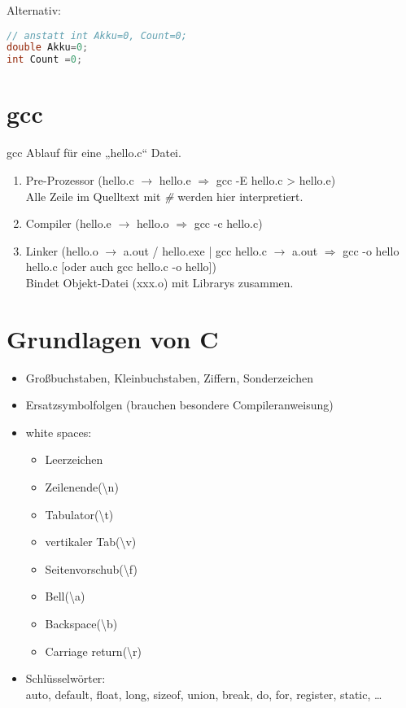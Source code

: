 Alternativ:
\begin{lstlisting}[language=C]
// anstatt int Akku=0, Count=0;
double Akku=0;
int Count =0;
\end{lstlisting}

\section{gcc}

gcc Ablauf für eine „hello.c“ Datei.

\begin{enumerate}
\item Pre-Prozessor (hello.c $\rightarrow$ hello.e $\Rightarrow$ gcc -E hello.c > hello.e) \\
Alle Zeile im Quelltext mit \emph{\#} werden hier interpretiert.
\item Compiler (hello.e $\rightarrow$ hello.o $\Rightarrow$ gcc -c hello.c)
\item Linker (hello.o $\rightarrow$ a.out / hello.exe | gcc hello.c $\rightarrow$ a.out $\Rightarrow$ gcc -o hello hello.c [oder auch gcc hello.c -o hello])\\
Bindet Objekt-Datei (xxx.o) mit Librarys zusammen.
\end{enumerate}

\section{Grundlagen von C}

\begin{itemize}
\item Großbuchstaben, Kleinbuchstaben, Ziffern, Sonderzeichen
\item Ersatzsymbolfolgen (brauchen besondere Compileranweisung)
\item white spaces: 
\begin{itemize}
\item Leerzeichen
\item Zeilenende(\textbackslash n)
\item Tabulator(\textbackslash t)
\item vertikaler Tab(\textbackslash v)
\item Seitenvorschub(\textbackslash f)
\item Bell(\textbackslash a)
\item Backspace(\textbackslash b)
\item Carriage return(\textbackslash r)
\end{itemize}
\item Schlüsselwörter:\\
auto, default, float, long, sizeof, union, break, do, for, register, static, …
\end{itemize}

